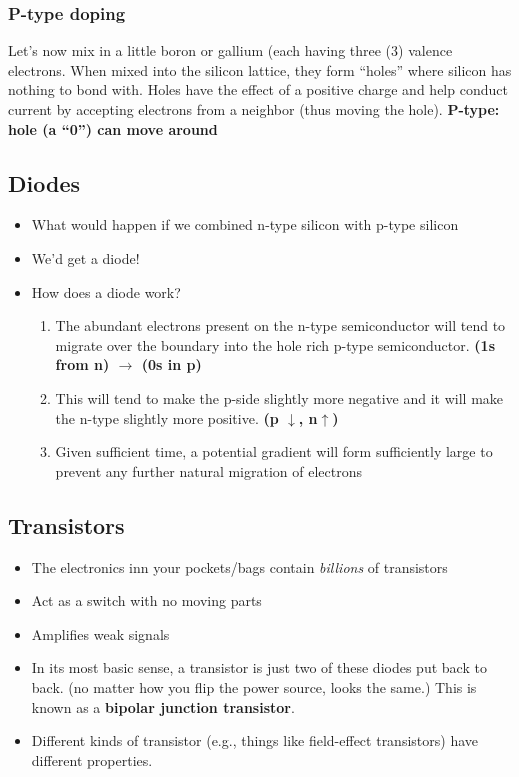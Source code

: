 \documentclass[11pt]{book}
\begin{document}
\subsubsection{P-type doping}
Let's now mix in a little boron or gallium (each having three (3) valence electrons. When mixed into the silicon lattice, they form ``holes'' where silicon has nothing to bond with. Holes have the effect of a positive charge and help conduct current by accepting electrons from a neighbor (thus moving the hole). \textbf{P-type: hole (a ``0'') can move around}



\subsection{Diodes}
\begin{itemize}
	\item What would happen if we combined n-type silicon with p-type silicon 
	\item We'd get a diode! 
	\item How does a diode work?
	\begin{enumerate}
		\item The abundant electrons present on the n-type semiconductor will tend to migrate over the boundary into the hole rich p-type semiconductor. 
		\subitem \textbf{(1s from n) $\rightarrow$ (0s in p)}
		\item This will tend to make the p-side slightly more negative and it will make the n-type slightly more positive. 
		\subitem \textbf{(p $\downarrow$, n$\uparrow$)}
		\item Given sufficient time, a potential gradient will form sufficiently large to prevent any further natural migration of electrons 
	\end{enumerate}
\end{itemize}





\subsection{Transistors}

\begin{itemize}
	\item The electronics inn your pockets/bags contain \textit{billions} of transistors
	\item Act as a switch with no moving parts
	\item Amplifies weak signals
	\item In its most basic sense, a transistor is just two of these diodes put back to back. (no matter how you flip the power source, looks the same.) This is known as a \textbf{bipolar junction transistor}.
	\item Different kinds of transistor (e.g., things like field-effect transistors) have different properties. 
\end{itemize}
\end{document}
